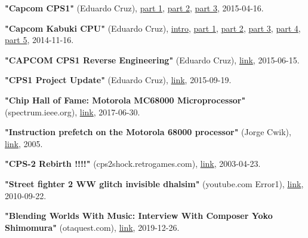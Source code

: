 \begin{thebibliography}{999}
  \textbf{"Capcom CPS1"} (Eduardo Cruz),
  \href{http://arcadehacker.blogspot.com/2015/04/capcom-cps1-part-1.html}{part 1},
  \href{http://arcadehacker.blogspot.com/2015/05/capcom-cps1-part-2.html}{part 2},
  \href{http://arcadehacker.blogspot.com/2015/06/capcom-cps1-part-3.html}{part 3},
  2015-04-16.
  
  \textbf{"Capcom Kabuki CPU"} (Eduardo Cruz),
  \href{ http://arcadehacker.blogspot.com/2014/11/capcom-kabuki-cpu-intro.html}{intro},
  \href{http://arcadehacker.blogspot.com/2014/11/capcom-kabuki-cpu-part-1.html}{part 1},
  \href{http://arcadehacker.blogspot.com/2014/11/capcom-kabuki-cpu-part-2.html}{part 2},
  \href{http://arcadehacker.blogspot.com/2014/11/capcom-kabuki-cpu-part-3.html}{part 3},
  \href{http://arcadehacker.blogspot.com/2014/11/capcom-kabuki-cpu-part-4.html}{part 4},
  \href{http://arcadehacker.blogspot.com/2014/11/capcom-kabuki-cpu-part-5.html}{part 5},
  2014-11-16.

  \textbf{"CAPCOM CPS1 Reverse Engineering"} (Eduardo Cruz),
  \href{https://www.youtube.com/watch?v=IBZc__9sM28}{link},
  2015-06-15.

  \textbf{"CPS1 Project Update"} (Eduardo Cruz),
  \href{http://arcadehacker.blogspot.com/2015/09/project-update.html}{link},
  2015-09-19.

  \textbf{"Chip Hall of Fame: Motorola MC68000 Microprocessor"} (spectrum.ieee.org),
  \href{https://spectrum.ieee.org/tech-history/silicon-revolution/chip-hall-of-fame-motorola-mc68000-microprocessor}{link},
  2017-06-30.

  \textbf{"Instruction prefetch on the Motorola 68000 processor"} (Jorge Cwik),
  \href{http://pasti.fxatari.com/68kdocs/68kPrefetch.html}{link},
  2005.
  

  \textbf{"CPS-2 Rebirth !!!!"} (cps2shock.retrogames.com),
  \href{https://web.archive.org/web/20060812042251/http://cps2shock.retrogames.com/wip.html}{link},
  2003-04-23.

  \textbf{"Street fighter 2 WW glitch invisible dhalsim"} (youtube.com Error1),
  \href{https://www.youtube.com/watch?v=qEFPzcOK_uQ}{link},
  2010-09-22.

  \textbf{"Blending Worlds With Music: Interview With Composer Yoko Shimomura"} (otaquest.com),
  \href{https://www.otaquest.com/yoko-shimomura-interview/}{link},
  2019-12-26.


\end{thebibliography}
